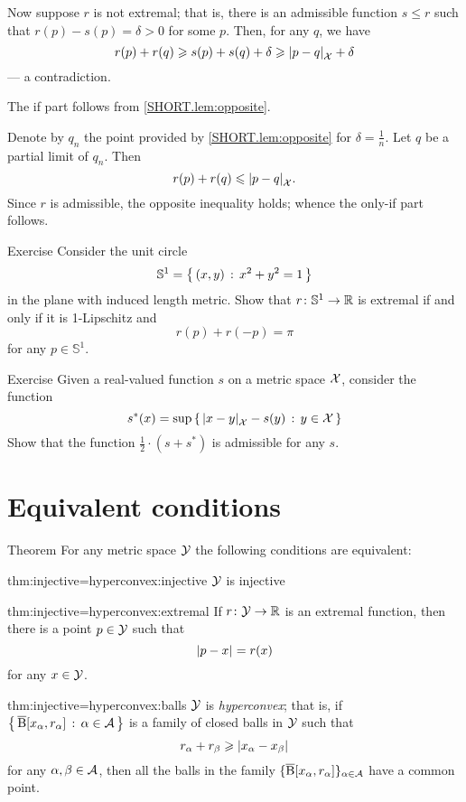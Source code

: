 Now suppose $r$ is not extremal; that is, there is an admissible function $s\le r$ such that $r(p)-s(p)=\delta>0$ for some $p$.
Then, for any $q$, we have
\[r(p)+r(q)\ge s(p)+s(q)+\delta\ge \dist{p}{q}{\spc{X}}+\delta\]
--- a contradiction.

The if part follows from \ref{SHORT.lem:opposite}.

Denote by $q_n$ the point provided by \ref{SHORT.lem:opposite} for $\delta=\tfrac1n$.
Let $q$ be a partial limit of $q_n$. 
Then 
\[r(p)+r(q)\le\dist{p}{q}{\spc{X}}.\]
Since $r$ is admissible, the opposite inequality holds;
whence the only-if part follows.
\qeds

\begin{thm}{Exercise}\label{ex:circle}
Consider the unit circle 
\[\mathbb{S}^1=\left\{\,{(x,y)}\,:\,{x^2+y^2=1}\,\right\}\]
in the plane with induced length metric.
Show that $r\colon\mathbb{S}^1\to\mathbb{R}$ is extremal if and only if it is 1-Lipschitz and 
\[r(p)+r(-p)=\pi\] for any $p\in\mathbb{S}^1$.
\end{thm}

\begin{thm}{Exercise}\label{ex:retraction}
Given a real-valued function $s$ on a metric space $\mathcal{X}$,
consider the function
\[s^*(x)=\sup\set{\dist{x}{y}{\spc{X}}-s(y)}{y\in \spc{X}}\]
Show that the function $\tfrac12\cdot(s+s^*)$ is admissible for any $s$.
\end{thm}

\section{Equivalent conditions}

\begin{thm}{Theorem}\label{thm:injective=hyperconvex}
For any metric space $\mathcal{Y}$ the following conditions are equivalent:

\begin{subthm}{thm:injective=hyperconvex:injective}
$\mathcal{Y}$ is injective
\end{subthm}


\begin{subthm}{thm:injective=hyperconvex:extremal}
If $r\colon\mathcal{Y}\to\mathbb{R}$ is an extremal function, then there is a point $p\in \mathcal{Y}$ such that 
\[\dist{p}{x}{}= r(x)\]
for any $x\in \mathcal{Y}$.
\end{subthm}

\begin{subthm}{thm:injective=hyperconvex:balls}
$\mathcal{Y}$ is \emph{hyperconvex};
that is, if $\left\{\,{\overline{\mathrm{B}}{}[x_\alpha,r_\alpha]}\,:\,{\alpha\in\mathcal{A}}\,\right\}$ is a family of closed balls in $\mathcal{Y}$ such that 
 \[r_\alpha+r_\beta\ge \dist{x_\alpha}{x_\beta}{}\]
 for any $\alpha,\beta\in \mathcal{A}$, then all the balls in the family $\{\overline{\mathrm{B}}{}[x_\alpha,r_\alpha]\}_{\alpha\in\mathcal{A}}$ have a common point.
\end{subthm}

\end{thm}

